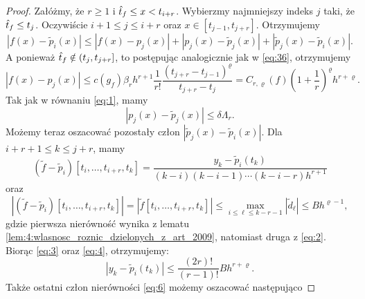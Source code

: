 \documentclass[oik, pdftex, man]{mgrwms}
\begin{document}
\begin{proof}
        Załóżmy, że $r \geq 1$ i $\hat{t}_{f} \leq x<t_{i+r}$. Wybierzmy najmniejszy indeks $j$ taki, że $\hat{t}_{f} \leq t_{j}$. Oczywiście $i+1 \leq j \leq i+r$ oraz $x \in\left[t_{j-1}, t_{j+r}\right]$. 
        Otrzymujemy
        \begin{equation} \label{eq:6}
            \left|f(x)-\tilde{p}_{i}(x)\right| \leq\left|f(x)-p_{j}(x)\right|+\left|p_{j}(x)-\tilde{p}_{j}(x)\right|+\left|\tilde{p}_{j}(x)-\tilde{p}_{i}(x)\right|.
        \end{equation}
        A ponieważ $\hat{t}_{f} \notin\left(t_{j}, t_{j+r}\right]$, to postępując analogicznie jak w \eqref{eq:36}, otrzymujemy
        \begin{equation*}
            \left|f(x)-p_{j}(x)\right| \leq c\left(g_{f}\right) \beta_{r} h^{r+1} \frac{1}{r !} \frac{\left(t_{j+r}-t_{j-1}\right)^{\varrho}}{t_{j+r}-t_{j}}=C_{r, \varrho}(f)\left(1+\frac{1}{r}\right)^{\varrho} h^{r+\varrho}.
        \end{equation*}
        Tak jak w równaniu \eqref{eq:1}, mamy
        \begin{equation*}
            \left|p_{j}(x)-\tilde{p}_{j}(x)\right| \leq \delta \Lambda_{r}.
        \end{equation*}
        Możemy teraz oszacować pozostały człon $\left|\tilde{p}_{j}(x)-\tilde{p}_{i}(x)\right|$. Dla $i+r+1 \leq k \leq j+r$, mamy
        \begin{equation} \label{eq:3}
            \left(\tilde{f}-\tilde{p}_{i}\right)\left[t_{i}, \ldots, t_{i+r}, t_{k}\right]=\frac{y_{k}-\tilde{p}_{i}\left(t_{k}\right)}{(k-i)(k-i-1) \cdots(k-i-r) h^{r+1}}
        \end{equation}
        oraz
        \begin{equation} \label{eq:4}
            \left|\left(\tilde{f}-\tilde{p}_{i}\right)\left[t_{i}, \ldots, t_{i+r}, t_{k}\right]\right|=\left|\tilde{f}\left[t_{i}, \ldots, t_{i+r}, t_{k}\right]\right| \leq \max_{i \leq \ell \leq k-r-1}\left|\tilde{d}_{\ell}\right| \leq B h^{\varrho-1},
        \end{equation}
        gdzie pierwsza nierówność wynika z lematu \ref{lem:4:wlasnosc_roznic_dzielonych_z_art_2009}, natomiast druga z \eqref{eq:2}. Biorąc \eqref{eq:3} oraz \eqref{eq:4}, otrzymujemy:
        \begin{equation} \label{eq:5}
            \left|y_{k}-\tilde{p}_{i}\left(t_{k}\right)\right| \leq \frac{(2 r) !}{(r-1) !} B h^{r+\varrho}.
        \end{equation}
        Także ostatni człon nierówności \eqref{eq:6} możemy oszacować następująco

\end{proof}
\end{document}
